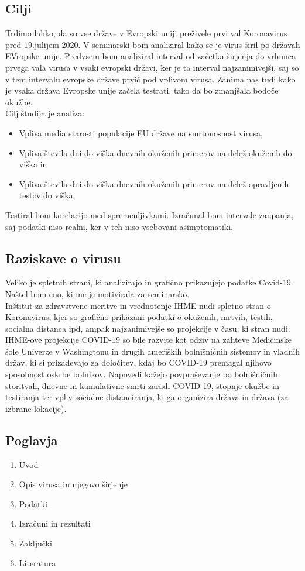 \documentclass[a4paper,11pt]{article}
\begin{document}
\subsection{Cilji}
Trdimo lahko, da so vse države v Evropski uniji preživele prvi val Koronavirus pred 19.julijem 2020. V seminarski bom analiziral kako se je virus širil po državah EVropske unije. Predvsem bom analiziral interval od začetka širjenja do vrhunca prvega vala virusa v vsaki evropski državi, ker je ta interval najzanimivejši, saj so v tem intervalu evropske države prvič pod vplivom virusa. Zanima nas tudi kako je vsaka država Evropske unije začela testrati, tako da bo zmanjšala bodoče okužbe. \\
Cilj študija je analiza:
\begin{itemize}
\item{Vpliva media starosti populacije EU države na smrtonosnost virusa, }
\item{Vpliva števila dni do viška dnevnih okuženih primerov na delež okuženih do viška in }
\item{Vpliva števila dni do viška dnevnih okuženih primerov na delež opravljenih testov do viška. }
\end{itemize}
Testiral bom korelacijo med spremenljivkami. Izračunal bom intervale zaupanja, saj podatki niso realni, ker v teh niso vsebovani asimptomatiki.


\subsection{Raziskave o virusu}
Veliko je spletnih strani, ki analizirajo in grafično prikazujejo podatke Covid-19. Naštel bom eno, ki me je motivirala za seminarsko. \\
Inštitut za zdravstvene meritve in vrednotenje IHME nudi spletno stran o Koronavirus, kjer so grafično prikazani podatki o okuženih, mrtvih, testih, socialna distanca ipd, ampak najzanimivejše so projekcije v času, ki stran nudi. IHME-ove projekcije COVID-19 so bile razvite kot odziv na zahteve Medicinske šole Univerze v Washingtonu in drugih ameriških bolnišničnih sistemov in vladnih držav, ki si prizadevajo za določitev, kdaj bo COVID-19 premagal njihovo sposobnost oskrbe bolnikov. Napovedi kažejo povpraševanje po bolnišničnih storitvah, dnevne in kumulativne smrti zaradi COVID-19, stopnje okužbe in testiranja ter vpliv socialne distanciranja, ki ga organizira država in država (za izbrane lokacije).

\subsection{Poglavja}
\begin{enumerate}
\item{Uvod}
\item{Opis virusa in njegovo širjenje}
\item{Podatki}
\item{Izračuni in rezultati}
\item{Zaključki}
\item{Literatura}
\end{enumerate}
\end{document}
